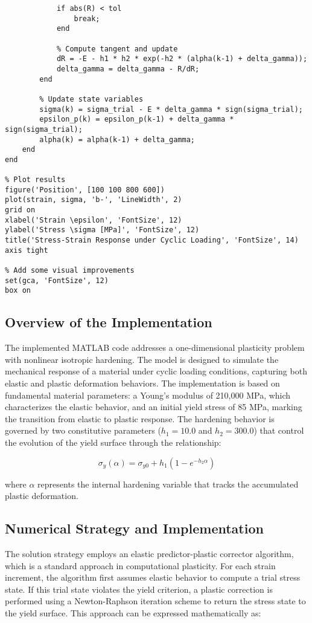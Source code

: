 \documentclass{article}
\begin{document}
\begin{lstlisting}[caption={MATLAB Code for 1D Plasticity Problem}, label={lst:plasticity}]
            % Check convergence
            if abs(R) < tol
                break;
            end
            
            % Compute tangent and update
            dR = -E - h1 * h2 * exp(-h2 * (alpha(k-1) + delta_gamma));
            delta_gamma = delta_gamma - R/dR;
        end
        
        % Update state variables
        sigma(k) = sigma_trial - E * delta_gamma * sign(sigma_trial);
        epsilon_p(k) = epsilon_p(k-1) + delta_gamma * sign(sigma_trial);
        alpha(k) = alpha(k-1) + delta_gamma;
    end
end

% Plot results
figure('Position', [100 100 800 600])
plot(strain, sigma, 'b-', 'LineWidth', 2)
grid on
xlabel('Strain \epsilon', 'FontSize', 12)
ylabel('Stress \sigma [MPa]', 'FontSize', 12)
title('Stress-Strain Response under Cyclic Loading', 'FontSize', 14)
axis tight

% Add some visual improvements
set(gca, 'FontSize', 12)
box on
\end{lstlisting}

\subsection{Overview of the Implementation}

The implemented MATLAB code addresses a one-dimensional plasticity problem with nonlinear isotropic hardening. The model is designed to simulate the mechanical response of a material under cyclic loading conditions, capturing both elastic and plastic deformation behaviors. The implementation is based on fundamental material parameters: a Young's modulus of 210,000 MPa, which characterizes the elastic behavior, and an initial yield stress of 85 MPa, marking the transition from elastic to plastic response. The hardening behavior is governed by two constitutive parameters ($h_1 = 10.0$ and $h_2 = 300.0$) that control the evolution of the yield surface through the relationship:

$$ \sigma_y(\alpha) = \sigma_{y0} + h_1(1-e^{-h_2\alpha}) $$

where $\alpha$ represents the internal hardening variable that tracks the accumulated plastic deformation.

\subsection{Numerical Strategy and Implementation}

The solution strategy employs an elastic predictor-plastic corrector algorithm, which is a standard approach in computational plasticity. For each strain increment, the algorithm first assumes elastic behavior to compute a trial stress state. If this trial state violates the yield criterion, a plastic correction is performed using a Newton-Raphson iteration scheme to return the stress state to the yield surface. This approach can be expressed mathematically as:
\end{document}
